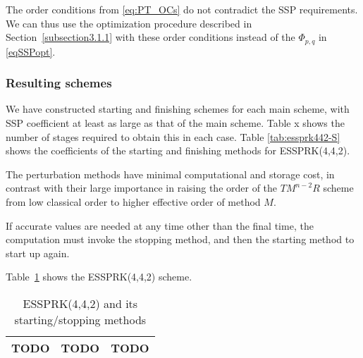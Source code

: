 The order conditions from \eqref{eq:PT_OCs} do not contradict the SSP
requirements.  We can thus use the optimization procedure described in
Section~\ref{subsection3.1.1} with these order conditions instead of
the $\Phi_{p,q}$ in \eqref{eqSSPopt}. 

\subsubsection{Resulting schemes}
We have constructed starting and finishing schemes for each main scheme,
with SSP coefficient at least as large as that of the main scheme.
Table x shows the number of stages required to obtain this in each case.
Table \ref{tab:essprk442-S} shows the coefficients of the starting and finishing methods for 
ESSPRK(4,4,2).

The perturbation methods have minimal computational and storage cost, in
contrast with their large importance in raising the order of the \(
TM^{n-2}R \) scheme from low classical order to higher effective order of
method \( M \).

If accurate values are needed at any time other than the final time, the
computation must invoke the stopping method, and then the starting method to start up again. 

Table~\ref{tab:essprk442} shows the ESSPRK(4,4,2) scheme.

\begin{table}
  \caption{ESSPRK(4,4,2) and its starting/stopping methods}
  \label{tab:essprk442}
  \centering
  \begin{tabular}{|c|c|c|}
    \hline
    TODO & TODO & TODO \\
    \hline
  \end{tabular}
\end{table}
